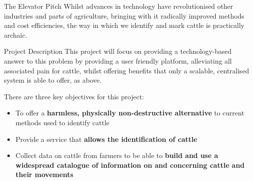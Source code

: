 

\begin{subsection}{The Elevator Pitch}
  Whilst advances in technology have revolutionised other industries and parts of agriculture, bringing with it radically improved methods and cost efficiencies, the way in which we identify and mark cattle is practically archaic.
\end{subsection}
 

\begin{subsection}{Project Description}
  This project will focus on providing a technology-based answer to this problem by providing a user friendly platform, alleviating all associated pain for cattle, whilst offering benefits that only a scalable, centralised system is able to offer, as above.
    
  There are three key objectives for this project:
  
  \begin{itemize}
  	\item To offer a \textbf{harmless, physically non-destructive alternative} to current methods used to identify cattle
  	\item Provide a service that \textbf{allows the identification of cattle}
  	\item Collect data on cattle from farmers to be able to \textbf{build and use a widespread catalogue of information on and concerning cattle and their movements}
  \end{itemize}
\end{subsection}


